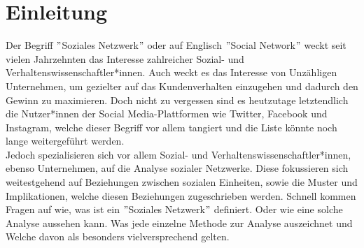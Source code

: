 \chapter{Einleitung}\label{ch:einleitung}
Der Begriff $"$Soziales Netzwerk$"$ oder auf Englisch $"$Social Network$"$ weckt seit vielen Jahrzehnten das Interesse zahlreicher Sozial- und Verhaltenswissenschaftler*innen. Auch weckt es das Interesse von Unzähligen Unternehmen, um gezielter auf das Kundenverhalten einzugehen und dadurch den Gewinn zu maximieren. Doch nicht zu vergessen sind es heutzutage letztendlich die Nutzer*innen der Social Media-Plattformen wie Twitter, Facebook und Instagram, welche dieser Begriff vor allem tangiert und die Liste könnte noch lange weitergeführt werden.\\
Jedoch spezialisieren sich vor allem Sozial- und Verhaltenswissenschaftler*innen, ebenso Unternehmen, auf die Analyse sozialer Netzwerke. Diese fokussieren sich weitestgehend auf Beziehungen zwischen sozialen Einheiten, sowie die Muster und Implikationen, welche diesen Beziehungen zugeschrieben werden.
Schnell kommen Fragen auf wie, was ist ein $"$Soziales Netzwerk$"$ definiert. Oder wie eine solche Analyse aussehen kann. Was jede einzelne Methode zur Analyse auszeichnet und Welche davon als besonders vielversprechend gelten.


